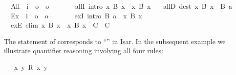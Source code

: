 \begin{isabellebody}
\isanewline
\ \ All\ {\isacharcolon}{\isacharcolon}\ {\isachardoublequoteopen}{\isacharparenleft}i\ {\isasymRightarrow}\ o{\isacharparenright}\ {\isasymRightarrow}\ o{\isachardoublequoteclose}\ \ {\isacharparenleft}\ {\isachardoublequoteopen}{\isasymforall}{\isachardoublequoteclose}\ {}{}{\isacharparenright}\ \isanewline
\ \ allI\ {\isacharbrackleft}intro{\isacharbrackright}{\isacharcolon}\ {\isachardoublequoteopen}{\isacharparenleft}{\isasymAnd}x{\isachardot}\ B\ x{\isacharparenright}\ {\isasymLongrightarrow}\ {\isasymforall}x{\isachardot}\ B\ x{\isachardoublequoteclose}\ \isanewline
\ \ allD\ {\isacharbrackleft}dest{\isacharbrackright}{\isacharcolon}\ {\isachardoublequoteopen}{\isacharparenleft}{\isasymforall}x{\isachardot}\ B\ x{\isacharparenright}\ {\isasymLongrightarrow}\ B\ a{\isachardoublequoteclose}\isanewline
\isanewline
{}\isamarkupfalse%
\isanewline
\ \ Ex\ {\isacharcolon}{\isacharcolon}\ {\isachardoublequoteopen}{\isacharparenleft}i\ {\isasymRightarrow}\ o{\isacharparenright}\ {\isasymRightarrow}\ o{\isachardoublequoteclose}\ \ {\isacharparenleft}\ {\isachardoublequoteopen}{\isasymexists}{\isachardoublequoteclose}\ {}{}{\isacharparenright}\ \isanewline
\ \ exI\ {\isacharbrackleft}intro{\isacharbrackright}{\isacharcolon}\ {\isachardoublequoteopen}B\ a\ {\isasymLongrightarrow}\ {\isacharparenleft}{\isasymexists}x{\isachardot}\ B\ x{\isacharparenright}{\isachardoublequoteclose}\ \isanewline
\ \ exE\ {\isacharbrackleft}elim{\isacharbrackright}{\isacharcolon}\ {\isachardoublequoteopen}{\isacharparenleft}{\isasymexists}x{\isachardot}\ B\ x{\isacharparenright}\ {\isasymLongrightarrow}\ {\isacharparenleft}{\isasymAnd}x{\isachardot}\ B\ x\ {\isasymLongrightarrow}\ C{\isacharparenright}\ {\isasymLongrightarrow}\ C{\isachardoublequoteclose}%
\begin{isamarkuptext}%
\noindent The statement of  corresponds to ``'' in Isar.  In the
  subsequent example we illustrate quantifier reasoning involving all
  four rules:%
\end{isamarkuptext}%
\isamarkuptrue%
\isamarkupfalse%
\isanewline
\ \ \ {\isachardoublequoteopen}{\isasymexists}x{\isachardot}\ {\isasymforall}y{\isachardot}\ R\ x\ y{\isachardoublequoteclose}\isanewline

\end{isabellebody}
